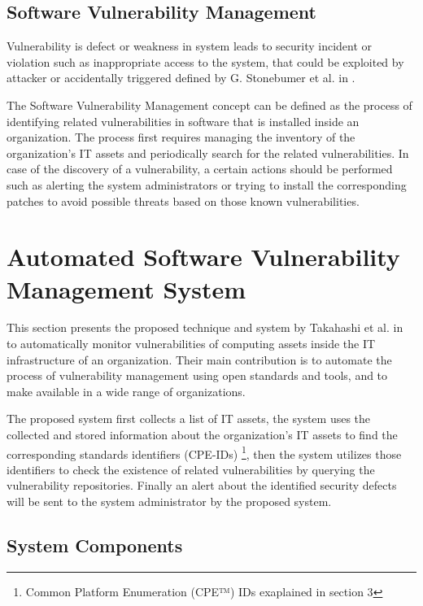 \documentclass{llncs}
\begin{document}
       
\subsection{Software Vulnerability Management}

\par Vulnerability is defect or weakness in system leads to security incident or violation such as inappropriate access to the system, that could be exploited by attacker or accidentally triggered defined by G. Stonebumer et al. in \cite{vuln}.  

\par The Software Vulnerability Management concept can be defined as the process of identifying related vulnerabilities in software that is installed inside an organization. The process first requires managing the inventory of the organization's IT assets and  periodically search for the related vulnerabilities. In case of the discovery of a vulnerability, a certain actions should be performed such as alerting the system administrators or trying to install the corresponding patches to avoid possible threats based on those known vulnerabilities. 



   
\section{Automated Software Vulnerability Management System}

\par This section presents the proposed technique and system by Takahashi et al. in \cite{paper1} to automatically monitor vulnerabilities of computing assets inside the IT infrastructure of an organization. Their main contribution is to automate the process of vulnerability management using open standards and tools, and to make available in a wide range of organizations.
\par
 The proposed system first collects a list of IT assets, the system uses the collected and stored information about the organization's IT assets to find the corresponding standards identifiers (CPE-IDs) \footnote{ Common Platform Enumeration (CPE™) IDs exaplained in section 3}, then the system utilizes those identifiers to check the existence of related vulnerabilities by querying the vulnerability repositories. Finally an alert about the identified security defects will be sent to the system administrator by the proposed system.
    
\subsection{System Components}
\end{document}
